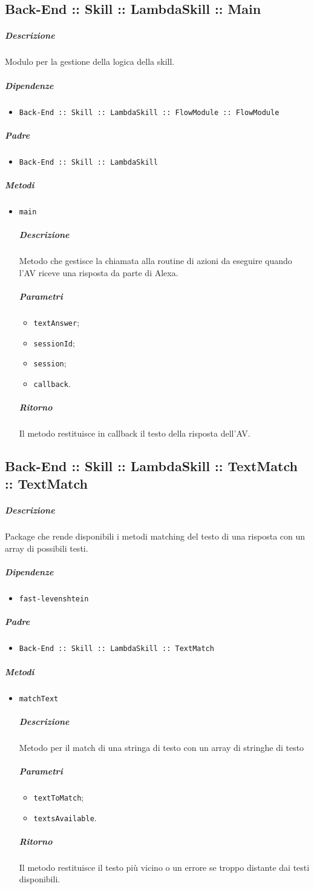 \documentclass[../ManualeSviluppatore_v2.0.0.tex]{subfiles}
\begin{document}
\subsection{Back-End :: Skill :: LambdaSkill :: Main}
\subparagraph{Descrizione} Modulo per la gestione della logica della skill.
\subparagraph{Dipendenze}
\begin{itemize}
	\item \texttt{Back-End :: Skill :: LambdaSkill :: FlowModule :: FlowModule}
\end{itemize}
\subparagraph{Padre}
\begin{itemize}
	\item \texttt{Back-End :: Skill :: LambdaSkill}
\end{itemize}
\subparagraph{Metodi}
\begin{itemize}
	\item \texttt{main}
	      \subparagraph{Descrizione} Metodo che gestisce la chiamata alla routine di azioni da eseguire quando l'AV riceve una risposta da parte di Alexa.
	      \subparagraph{Parametri}
	      \begin{itemize}
	      	\item \texttt{textAnswer};
	      	\item \texttt{sessionId};
	      	\item \texttt{session};
	      	\item \texttt{callback}.
	      \end{itemize}
	      \subparagraph{Ritorno} Il metodo restituisce in callback il testo della risposta dell'AV.
\end{itemize}

\subsection{Back-End :: Skill :: LambdaSkill :: TextMatch :: TextMatch}
\subparagraph{Descrizione} Package che rende disponibili i metodi matching del testo di una risposta con un array di possibili testi.
\subparagraph{Dipendenze} 
\begin{itemize}
\item \texttt{fast-levenshtein}
\end{itemize}
\subparagraph{Padre} 
\begin{itemize}
\item \texttt{Back-End :: Skill :: LambdaSkill :: TextMatch}
\end{itemize}
\subparagraph{Metodi}
\begin{itemize}
	\item \texttt{matchText}
	      \subparagraph{Descrizione} Metodo per il match di una stringa di testo con un array di stringhe di testo
	      \subparagraph{Parametri}
	      \begin{itemize}
	      	\item \texttt{textToMatch};
	      	\item \texttt{textsAvailable}.
	      \end{itemize}
	      \subparagraph{Ritorno} Il metodo restituisce il testo più vicino o un errore se troppo distante dai testi disponibili.
\end{itemize}
\end{document}

